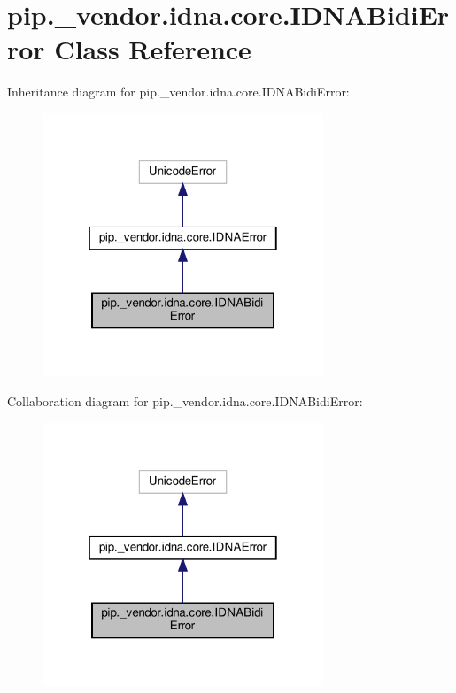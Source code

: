 \hypertarget{classpip_1_1__vendor_1_1idna_1_1core_1_1IDNABidiError}{}\section{pip.\+\_\+vendor.\+idna.\+core.\+I\+D\+N\+A\+Bidi\+Error Class Reference}
\label{classpip_1_1__vendor_1_1idna_1_1core_1_1IDNABidiError}


Inheritance diagram for pip.\+\_\+vendor.\+idna.\+core.\+I\+D\+N\+A\+Bidi\+Error\+:
\nopagebreak
\begin{figure}[H]
\begin{center}
\leavevmode
\includegraphics[width=238pt]{classpip_1_1__vendor_1_1idna_1_1core_1_1IDNABidiError__inherit__graph}
\end{center}
\end{figure}


Collaboration diagram for pip.\+\_\+vendor.\+idna.\+core.\+I\+D\+N\+A\+Bidi\+Error\+:
\nopagebreak
\begin{figure}[H]
\begin{center}
\leavevmode
\includegraphics[width=238pt]{classpip_1_1__vendor_1_1idna_1_1core_1_1IDNABidiError__coll__graph}
\end{center}
\end{figure}


